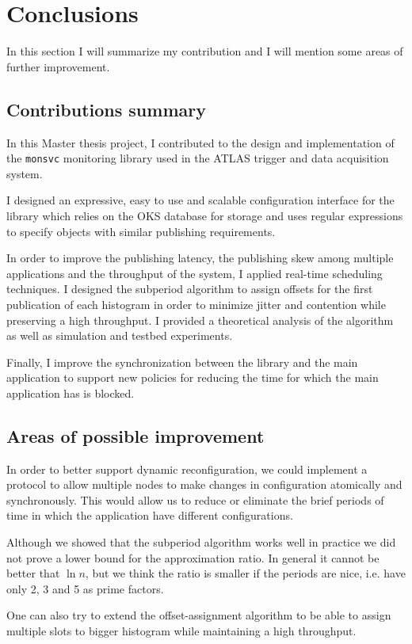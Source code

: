\chapter{Conclusions} %
\label{Capitolul6}


In this section I will summarize my contribution and I will mention some areas of further improvement.

\section{Contributions summary}

In this Master thesis project, I contributed to the design and implementation of the {\tt monsvc} monitoring library used in the ATLAS trigger and data acquisition system.

I designed an expressive, easy to use and scalable configuration interface for the library which relies on the OKS \citep{jones1998oks} database for storage and uses regular expressions to specify objects with similar publishing requirements.

In order to improve the publishing latency, the publishing skew among multiple applications and the throughput of the system, I applied real-time scheduling techniques. I designed the subperiod algorithm to assign offsets for the first publication of each histogram in order to minimize jitter and contention while preserving a high throughput. I provided a theoretical analysis of the algorithm as well as simulation and testbed experiments.

Finally, I improve the synchronization between the library and the main application to support new policies for reducing the time for which the main application has is blocked.


\section{Areas of possible improvement}

In order to better support dynamic reconfiguration, we could implement a protocol to allow multiple nodes to make changes in configuration atomically and synchronously. This would allow us to reduce or eliminate the brief periods of time in which the application have different configurations.

Although we showed that the subperiod algorithm works well in practice we did not prove a lower bound for the approximation ratio. In general it cannot be better that $\ln n$, but we think the ratio is smaller if the periods are nice, i.e. have only 2, 3 and 5 as prime factors.

One can also try to extend the offset-assignment algorithm to be able to assign multiple slots to bigger histogram while maintaining a high throughput.
